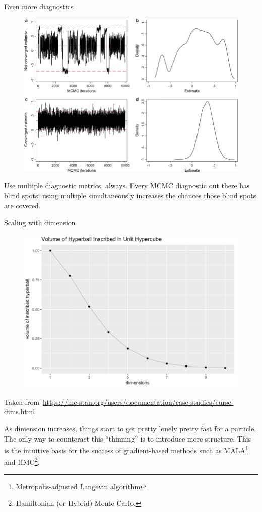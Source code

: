 \begin{frame}{Even more diagnostics}
\begin{figure}
\includegraphics[scale=0.25]{figures/traceplots.png}
\end{figure}
\begin{idea}
 Use multiple diagnostic metrics, always.
 Every MCMC diagnostic out there has blind spots; using multiple simultaneously increases the chances those blind spots are covered.
\end{idea}
\end{frame}
\begin{frame}{Scaling with dimension}
\begin{figure}
\includegraphics[scale=0.35]{figures/concentration_measure_volume.pdf}
\end{figure}
Taken from~\url{https://mc-stan.org/users/documentation/case-studies/curse-dims.html}.
\begin{idea}
 As dimension increases, things start to get pretty lonely pretty fast for a particle.
 The only way to counteract this ``thinning'' is to introduce more structure.
 This is the intuitive basis for the success of gradient-based methods such as MALA\footnote{Metropolis-adjusted Langevin algorithm} and HMC\footnote{Hamiltonian (or Hybrid) Monte Carlo.}.
\end{idea}
\end{frame}
